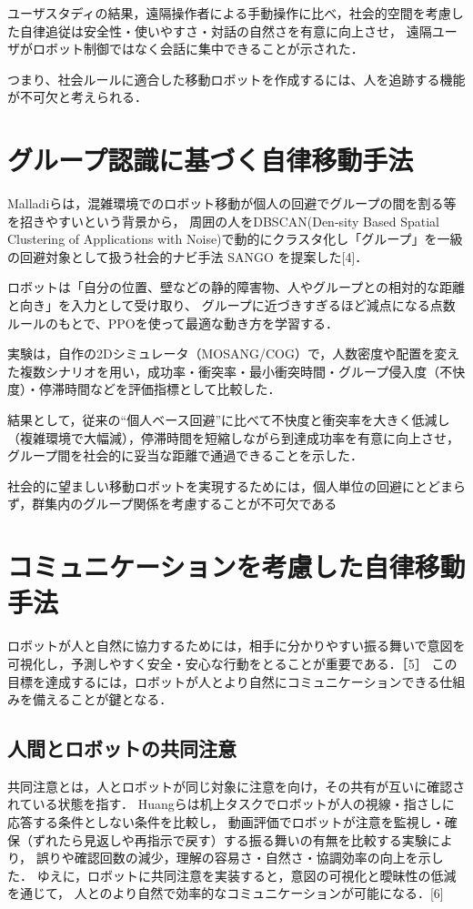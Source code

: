 \documentclass[dvipdfmx]{jarticle}
\begin{document}
 ユーザスタディの結果，遠隔操作者による手動操作に比べ，社会的空間を考慮した自律追従は安全性・使いやすさ・対話の自然さを有意に向上させ，
 遠隔ユーザがロボット制御ではなく会話に集中できることが示された．
 
 つまり、社会ルールに適合した移動ロボットを作成するには、人を追跡する機能が不可欠と考えられる．
  
\section{グループ認識に基づく自律移動手法}
  Malladiらは，混雑環境でのロボット移動が個人の回避でグループの間を割る等を招きやすいという背景から，
  周囲の人をDBSCAN(Den-sity Based Spatial Clustering of Applications with Noise)で動的にクラスタ化し「グループ」を一級の回避対象として扱う社会的ナビ手法 SANGO を提案した[4]．
  
  ロボットは「自分の位置、壁などの静的障害物、人やグループとの相対的な距離と向き」を入力として受け取り、
  グループに近づきすぎるほど減点になる点数ルールのもとで、PPOを使って最適な動き方を学習する．
  
  実験は，自作の2Dシミュレータ（MOSANG/COG）で，人数密度や配置を変えた複数シナリオを用い，成功率・衝突率・最小衝突時間・グループ侵入度（不快度）・停滞時間などを評価指標として比較した．
  
  結果として，従来の“個人ベース回避”に比べて不快度と衝突率を大きく低減し（複雑環境で大幅減），停滞時間を短縮しながら到達成功率を有意に向上させ，  
  グループ間を社会的に妥当な距離で通過できることを示した．
  
  社会的に望ましい移動ロボットを実現するためには，個人単位の回避にとどまらず，群集内のグループ関係を考慮することが不可欠である
\section{コミュニケーションを考慮した自律移動手法}
 ロボットが人と自然に協力するためには，相手に分かりやすい振る舞いで意図を可視化し，予測しやすく安全・安心な行動をとることが重要である．［5］
 この目標を達成するには，ロボットが人とより自然にコミュニケーションできる仕組みを備えることが鍵となる．


\subsection{人間とロボットの共同注意}
 共同注意とは，人とロボットが同じ対象に注意を向け，その共有が互いに確認されている状態を指す．
 Huangらは机上タスクでロボットが人の視線・指さしに応答する条件としない条件を比較し，
 動画評価でロボットが注意を監視し・確保（ずれたら見返しや再指示で戻す）する振る舞いの有無を比較する実験により，
 誤りや確認回数の減少，理解の容易さ・自然さ・協調効率の向上を示した．
 ゆえに，ロボットに共同注意を実装すると，意図の可視化と曖昧性の低減を通じて，
 人とのより自然で効率的なコミュニケーションが可能になる．[6]
 
\end{document}
